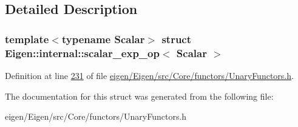 \subsection{Detailed Description}
\subsubsection*{template$<$typename Scalar$>$\newline
struct Eigen\+::internal\+::scalar\+\_\+exp\+\_\+op$<$ Scalar $>$}



Definition at line \hyperlink{eigen_2_eigen_2src_2_core_2functors_2_unary_functors_8h_source_l00231}{231} of file \hyperlink{eigen_2_eigen_2src_2_core_2functors_2_unary_functors_8h_source}{eigen/\+Eigen/src/\+Core/functors/\+Unary\+Functors.\+h}.



The documentation for this struct was generated from the following file\+:\begin{DoxyCompactItemize}
\item 
eigen/\+Eigen/src/\+Core/functors/\+Unary\+Functors.\+h\end{DoxyCompactItemize}
